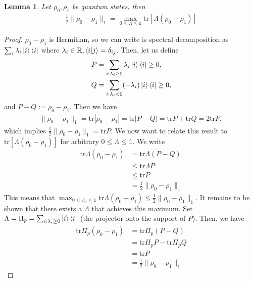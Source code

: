 \documentclass[notoc]{tufte-book}
\newtheorem{lemma}[theorem]{Lemma}
\begin{document}
\begin{tcolorbox}[colframe=white,breakable, colback=black!5, arc=0pt, outer arc=0pt]
\begin{lemma}\label{lem:lemma-1}
Let $\rho_0, \rho_1$ be quantum states, then 
\begin{align}\label{eq:trace-distance-max}
\frac{1}{2} \| \rho_0 - \rho_1\|_1 = \max_{0\leq \Lambda \leq \mathbb{1}} \text{tr}\left[\Lambda (\rho_0 - \rho_1)\right]
\end{align}
\end{lemma}
\end{tcolorbox}
\begin{proof}
$\rho_0-\rho_1$ is Hermitian, so we can write is spectral decomposition as $\sum_i \lambda_i \ket{i}\bra{i}$ where $\lambda_i \in \mathbb{R}, \braket{i|j} = \delta_{ij}$. Then, let us define
\begin{align}
    P &= \sum_{i:\lambda_i \geq 0} \lambda_i \ket{i}\bra{i} \geq 0, \\
    Q &= \sum_{i:\lambda_i < 0} (-\lambda_i) \ket{i}\bra{i} \geq 0,
\end{align}
and $P-Q := \rho_0 - \rho_1 $. Then we have
\begin{align}
    \|\rho_0 - \rho_1\|_1 = \text{tr} |\rho_0 - \rho_1| = \text{tr}|P-Q| = \text{tr}P + \text{tr}Q = 2\text{tr}P,
\end{align}
which implies $\frac{1}{2}\|\rho_0-\rho_1\|_1 = \text{tr}P$. We now want to relate this result to $\text{tr} \left[\Lambda (\rho_0 - \rho_1 )\right]$ for arbitrary $0\leq \Lambda \leq \mathbb{1}$. We write
\begin{align}
    \text{tr}\Lambda (\rho_0 - \rho_1)&= \text{tr}\Lambda(P-Q) \\
    &\leq \text{tr}\Lambda P \\
    &\leq \text{tr}P \\
    &= \frac{1}{2} \|\rho_0 - \rho_1\|_1
\end{align}
This means that $\max_{0\leq \Lambda_0 \leq \mathbb{1}} \text{tr}\Lambda(\rho_0 - \rho_1) \leq \frac{1}{2} \|\rho_0 - \rho_1\|_1$. It remains to be shown that there exists a $\Lambda$ that achieves this maximum. Set $ \Lambda = \Pi_p = \sum_{i:\lambda_i \geq 0} \ket{i}\bra{i}$ (the projector onto the support of $P$). Then, we have 
\begin{align}
    \text{tr} \Pi_p (\rho_0 - \rho_1) &= \text{tr} \Pi_p (P-Q)\\
    &=\text{tr} \Pi_p P - \text{tr} \Pi_p Q \\
    &= \text{tr} P \\
    &= \frac{1}{2} \| \rho_0 - \rho_1\|_1
\end{align}
\end{proof}
\end{document}
